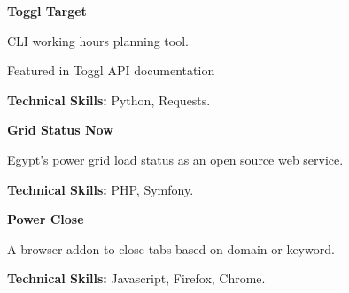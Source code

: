 

\begin{cventries}

  \cventry
    {\textbf{Toggl Target}} %
    {} %
    {} %
    {} %
    {
      \begin{cvitems} %
        \item {CLI working hours planning tool.}
        \item {Featured in Toggl API documentation}
        \item {\textbf{Technical Skills:} Python, Requests.}
      \end{cvitems}
    }


  \cventry
    {\textbf{Grid Status Now}} %
    {} %
    {} %
    {} %
    {
      \begin{cvitems} %
        \item {Egypt’s power grid load status as an open source web service.}
        \item {\textbf{Technical Skills:} PHP, Symfony.}
      \end{cvitems}
    }

  \cventry
    {\textbf{Power Close}} %
    {} %
    {} %
    {} %
    {
      \begin{cvitems} %
        \item {A browser addon to close tabs based on domain or keyword.}
        \item {\textbf{Technical Skills:} Javascript, Firefox, Chrome.}
      \end{cvitems}
    }

\end{cventries}
